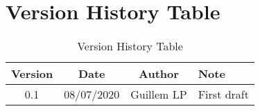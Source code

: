 \section{Version History Table}

\begin{table}[h]
	\centering
	\begin{tabular}{|c|c|c|l|}
		\hline
		Version & Date       & Author     & Note                                \\ \hline
		0.1     & 08/07/2020 & Guillem LP & First draft                         \\ \hline
	\end{tabular}
	\caption{Version History Table}
	\label{tab:version-table}
\end{table}